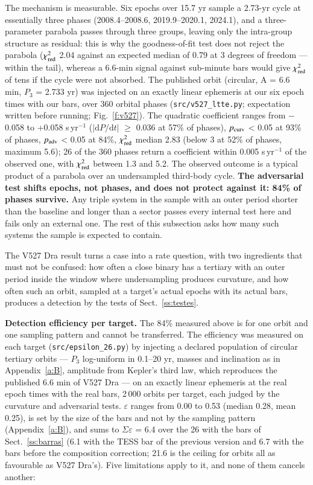 \documentclass{aa}
\begin{document}
The mechanism is measurable. Six epochs over 15.7 yr sample a 2.73-yr cycle at essentially three phases (2008.4--2008.6, 2019.9--2020.1, 2024.1), and a three-parameter parabola passes through three groups, leaving only the intra-group structure as residual: this is why the goodness-of-fit test does not reject the parabola ($\chi^2_{\rm red}$ 2.04 against an expected median of 0.79 at 3 degrees of freedom --- within the tail), whereas a 6.6-min signal against sub-minute bars would give $\chi^2_{\rm red}$ of tens if the cycle were not absorbed. The published orbit (circular, A = 6.6 min, $P_3$ = 2.733 yr) was injected on an exactly linear ephemeris at our six epoch times with our bars, over 360 orbital phases (\texttt{src/\allowbreak v527\_\allowbreak ltte.py}; expectation written before running; Fig.~\ref{f:v527}). The quadratic coefficient ranges from $-$0.058 to +0.058 s\,yr$^{-1}$ ($|\mathrm{d}P/\mathrm{d}t|$ $\ge$ 0.036 at 57\% of phases), $p_{\rm curv}$ < 0.05 at 93\% of phases, $p_{\rm adv}$ < 0.05 at 84\%, $\chi^2_{\rm red}$ median 2.83 (below 3 at 52\% of phases, maximum 5.6); 26 of the 360 phases return a coefficient within 0.005 s\,yr$^{-1}$ of the observed one, with $\chi^2_{\rm red}$ between 1.3 and 5.2. The observed outcome is a typical product of a parabola over an undersampled third-body cycle. \textbf{The adversarial test shifts epochs, not phases, and does not protect against it: 84\% of phases survive.} Any triple system in the sample with an outer period shorter than the baseline and longer than a sector passes every internal test here and fails only an external one. The rest of this subsection asks how many such systems the sample is expected to contain.

The V527 Dra result turns a case into a rate question, with two ingredients that must not be confused: how often a close binary has a tertiary with an outer period inside the window where undersampling produces curvature, and how often such an orbit, sampled at a target's actual epochs with its actual bars, produces a detection by the tests of Sect.~\ref{ss:testes}.

\textbf{Detection efficiency per target.} The 84\% measured above is for one orbit and one sampling pattern and cannot be transferred. The efficiency was measured on each target (\texttt{src/\allowbreak epsilon\_\allowbreak 26.py}) by injecting a declared population of circular tertiary orbits --- $P_3$ log-uniform in 0.1--20 yr, masses and inclination as in Appendix~\ref{a:B}, amplitude from Kepler's third law, which reproduces the published 6.6 min of V527 Dra --- on an exactly linear ephemeris at the real epoch times with the real bars, 2\,000 orbits per target, each judged by the curvature and adversarial tests. $\varepsilon$ ranges from 0.00 to 0.53 (median 0.28, mean 0.25), is set by the size of the bars and not by the sampling pattern (Appendix~\ref{a:B}), and sums to $\Sigma\varepsilon$ = 6.4 over the 26 with the bars of Sect.~\ref{ss:barras} (6.1 with the TESS bar of the previous version and 6.7 with the bars before the composition correction; 21.6 is the ceiling for orbits all as favourable as V527 Dra's). Five limitations apply to it, and none of them cancels another:
\end{document}
